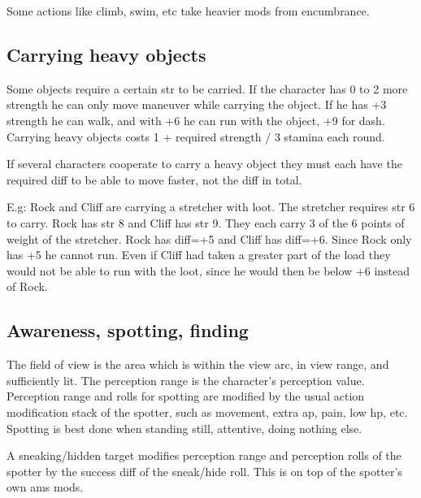 Some actions like climb, swim, etc take heavier mods from encumbrance.


\subsection*{Carrying heavy objects}
Some objects require a certain str to be carried. If the character has 0 to 2 more strength he can only move maneuver while carrying the object. If he has +3 strength he can walk, and with +6 he can run with the object, +9 for dash.
Carrying heavy objects costs 1 + required strength / 3 stamina each round.

If several characters cooperate to carry a heavy object they must each have the required diff to be able to move faster, not the diff in total.

E.g: Rock and Cliff are carrying a stretcher with loot. The stretcher requires str 6 to carry. Rock has str 8 and Cliff has str 9. They each carry 3 of the 6 points of weight of the stretcher. Rock has diff=+5 and Cliff has diff=+6. Since Rock only has +5 he cannot run. Even if Cliff had taken a greater part of the load they would not be able to run with the loot, since he would then be below +6 instead of Rock.










\subsection*{Awareness, spotting, finding}
The field of view is the area which is within the view arc, in view range, and sufficiently lit. The perception range is the character's perception value. Perception range and rolls for spotting are modified by the usual action modification stack of the spotter, such as movement, extra ap, pain, low hp, etc. Spotting is best done when standing still, attentive, doing nothing else.

A sneaking/hidden target modifies perception range and perception rolls of the spotter by the success diff of the sneak/hide roll. This is on top of the spotter's own ams mods.

